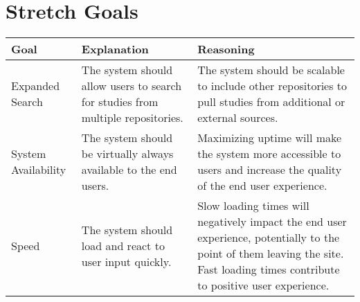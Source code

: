 \documentclass{article}
\begin{document}
\section{Stretch Goals}

\begin{table}[H]
\centering
\begin{tabular}{| p{3cm} | p{5cm} | p{5cm} |}
\hline
Goal & Explanation & Reasoning \\
\hline  \hline
Expanded Search & The system should allow users to search for studies from multiple repositories. & The system should be scalable to include other repositories to pull studies from additional or external sources. \\
\hline
System Availability & The system should be virtually always available to the end users. & Maximizing uptime will make the system more accessible to users and increase the quality of the end user experience. \\
\hline
Speed & The system should load and react to user input quickly. &  Slow loading times will negatively impact the end user experience, potentially to the point of them leaving the site. Fast loading times contribute to positive user experience. \\
\hline
\end{tabular}
\end{table}
\end{document}
